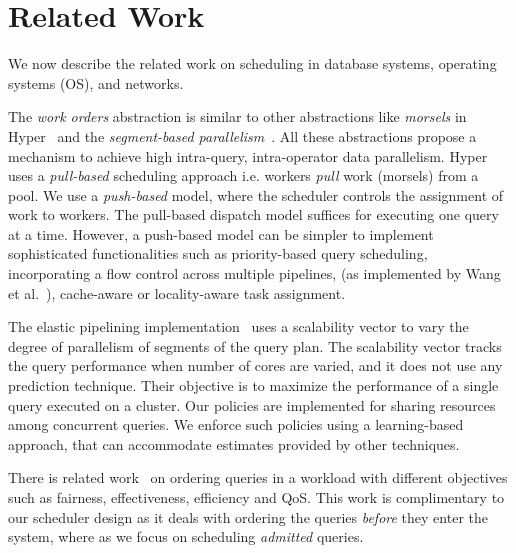 \section{Related Work}\label{sec:related}
We now describe the related work on scheduling in database systems, operating systems (OS), and networks. %

The \textit{work orders} abstraction is similar to other abstractions like \textit{morsels} in Hyper~\cite{morsel} and the \textit{segment-based parallelism}~\cite{wang2016elastic}. 
All these abstractions propose a mechanism to achieve high intra-query, intra-operator data parallelism.
Hyper~\cite{morsel} uses a \textit{pull-based} scheduling approach i.e. workers \textit{pull} work (morsels) from a pool. 
We use a \textit{push-based} model, where the scheduler controls the assignment of work to workers.
The pull-based dispatch model suffices for executing one query at a time. 
However, a push-based model can be simpler to implement sophisticated functionalities such as priority-based query scheduling, incorporating a flow control across multiple pipelines, (as implemented by Wang et al.~\cite{wang2016elastic}), cache-aware or locality-aware task assignment.

The elastic pipelining implementation~\cite{wang2016elastic} uses a scalability vector to vary the degree of parallelism of segments of the query plan.
The scalability vector tracks the query performance when number of cores are varied,  and it does not use any prediction technique.
Their objective is to maximize the performance of a single query executed on a cluster.
Our policies are implemented for sharing resources among concurrent queries.
We enforce such policies using a learning-based approach, that can accommodate estimates provided by other techniques.

There is related work~\cite{gupta2009fair} on ordering queries in a workload with different objectives such as fairness, effectiveness, efficiency and QoS. 
This work is complimentary to our scheduler design as it deals with ordering the queries \textit{before} they enter the system, where as we focus on scheduling \textit{admitted} queries. 

